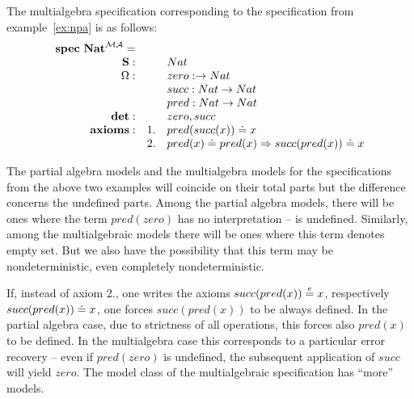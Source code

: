 \documentclass[10pt]{article}
\begin{document}
\begin{example}
The multialgebra specification corresponding to the specification from example~\ref{ex:npa}
is as follows:
\[ \begin{array}{rrl}
{\bf spec\ Nat}^{{\mathcal{MA}}}= \\
	{{\bf S}}: && Nat\\
	{\Omega}:	&& zero:\to Nat\\
		&& succ:Nat \to Nat\\
		&& pred:Nat \to Nat\\
{\bf det}:	&& zero, succ \\
{\bf axioms}:	&1.& pred(succ(x))\mathrel{\dot{=} } x \\
		&2.& pred(x)\mathrel{\dot{=} } pred(x) \Rightarrow succ(pred(x))\mathrel{\dot{=} } x\\
\end{array} \]
\end{example}
The partial algebra models and the multialgebra models for the specifications
from the above two examples will coincide on their total parts but the
difference concerns the undefined parts.
Among the partial algebra models, there will be ones where
the term $pred(zero)$ has no interpretation -- is undefined. Similarly, among
the multialgebraic models there will be ones where this term denotes empty set. 
But we also have the possibility that this term
may be nondeterministic, even completely nondeterministic. 

If, instead of axiom 2., one writes the axioms $succ(pred(x)) \stackrel{e}{=} x$, respectively
$succ(pred(x))\mathrel{\dot{=} } x$, one forces $succ(pred(x))$ to be always defined. In
the partial algebra case, due to strictness of all operations, this forces also
$pred(x)$ to be defined. In the multialgebra case this
corresponds to a particular error recovery -- even if $pred(zero)$ is
undefined, the subsequent application of $succ$ will yield $zero$. The model
class of the multialgebraic specification has ``more'' models.
\end{document}
